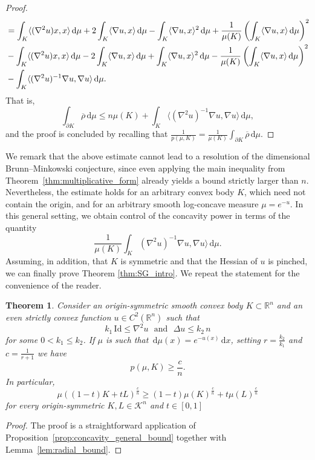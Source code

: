 \documentclass[a4paper, 11pt]{article}
\newcommand{\R}{\mathbb{R}}
\newcommand{\K}{\mathcal{K}}
\newcommand{\rhobar}{\overline{\rho}}
\newtheorem{theorem}{Theorem}[section]
\theoremstyle{definition}
\newcommand{\di}{\, \mathrm{d}}
\begin{document}
\begin{proof}
\begin{align}
    &= \int_{K}\langle (\nabla^2u)x,x\rangle \di \mu+2\int_{K}\langle \nabla u,x\rangle \di \mu- \int_{K}\langle \nabla u,x \rangle^2\di \mu+\frac{1}{\mu(K)}\left(\int_{K} \langle \nabla u, x \rangle \di \mu\right)^2 \\
    \notag &-\int_{K}\langle (\nabla^2u)x,x\rangle\di \mu-2\int_{K}\langle \nabla u,x\rangle\di \mu+\int_{K}\langle \nabla u,x \rangle^2\di \mu-\frac{1}{\mu(K)}\left(\int_{K} \langle \nabla u, x \rangle \di \mu\right)^2 \\
    &-\int_{K}\langle (\nabla^{2}u)^{-1}\nabla u,\nabla u\rangle \di \mu. \notag
\end{align}
That is, \[ \int_{\partial K }\rhobar \di \mu \leq n \mu(K) + \int_{K}\langle (\nabla^{2}u)^{-1}\nabla u,\nabla u\rangle \di \mu, \]
and the proof is concluded by recalling that $\frac{1}{p(\mu,K)} = \frac{1}{\mu(K)}\int_{\partial K} \rhobar \di \mu$.
\end{proof}

We remark that the above estimate cannot lead to a resolution of the dimensional Brunn--Minkowski conjecture, since even applying the main inequality from Theorem~\ref{thm:multiplicative_form} already yields a bound strictly larger than $n$. Nevertheless, the estimate holds for an arbitrary convex body $K$, which need not contain the origin, and for an arbitrary smooth log-concave measure $\mu=e^{-u}$. In this general setting, we obtain control of the concavity power in terms of the quantity
\[
 \frac{1}{\mu(K)}\int_{K}(\nabla^{2}u)^{-1}\nabla u,\nabla u\rangle\di\mu.
\]
Assuming, in addition, that $K$ is symmetric and that the Hessian of $u$ is pinched, we can finally prove Theorem \ref{thm:SG_intro}. We repeat the statement for the convenience of the reader.
\begin{theorem}
Consider an origin-symmetric smooth convex body $K \subset \R^n$ and an even strictly convex function $u \in C^2(\R^n)$ such that
\[
k_{1}\,\mathrm{Id} \leq \nabla^{2}u \,\,\text{ and } \,\,  \Delta u \leq k_{2}\,n
\]
for some $0 < k_{1} \leq k_{2}$. If $\mu$ is such that $\di\mu(x)=e^{-u(x)}\di x$, setting $r=\frac{k_{2}}{k_{1}}$ and $c=\frac{1}{r+1}$ we have
\begin{equation}\label{eq:radial_estimate}
p(\mu,K) \geq \frac{c}{n}.
\end{equation}
In particular, 
\[ \mu((1-t)K+tL)^{\frac{c}{n}}\geq (1-t)\mu(K)^{\frac{c}{n}}+t\mu(L)^{\frac{c}{n}}\] for every origin-symmetric $K, L \in \K^n$ and $t \in [0,1]$
\end{theorem}
\begin{proof}
The proof is a straightforward application of Proposition~\ref{prop:concavity_general_bound} together with Lemma~\ref{lem:radial_bound}.
\end{proof}
\end{document}
